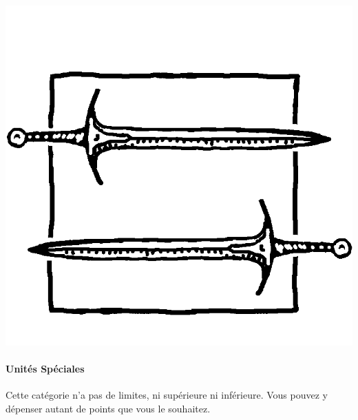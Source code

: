 \begin{minipage}[c]{0.17\textwidth}
\includegraphics[width=\textwidth]{../Layout/pics/logo_special.png}
\end{minipage}\hfill
\begin{minipage}[c]{0.80\textwidth}
\paragraph{Unités Spéciales}

Cette catégorie n'a pas de limites, ni supérieure ni inférieure. Vous pouvez y dépenser autant de points que vous le souhaitez.
\end{minipage}

